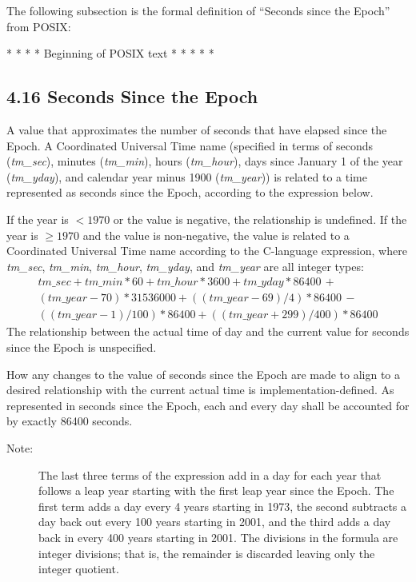 \documentclass[letterpaper,twoside]{article}
\begin{document}
The following subsection is the formal definition of ``Seconds
since the Epoch'' from POSIX:

\begin{center}
  {\large * * * * * Beginning of POSIX text * * * * *}
\end{center}

\subsection*{4.16 Seconds Since the Epoch}
A value that approximates the number
of seconds that have elapsed
since the Epoch. A Coordinated Universal Time name
(specified in terms of seconds ({\itshape tm\_sec}),
minutes ({\itshape tm\_min}),
hours ({\itshape tm\_hour}), days since January 1 of the year
({\itshape tm\_yday}),
and calendar year minus 1900 ({\itshape tm\_year})) is related to a time
represented as seconds since the Epoch, according to the expression below.

If the year is $< 1970$ or the value is negative, the relationship is
undefined.
If the year is $\geq 1970$ and the value is non-negative, the value is
related to a Coordinated Universal Time name according to the
C-language expression, where {\itshape tm\_sec}, {\itshape tm\_min},
{\itshape tm\_hour},
{\itshape tm\_yday}, and {\itshape tm\_year} are all integer types:
\begin{multline*}
  tm\_sec + tm\_min*60 + tm\_hour*3600 + tm\_yday*86400 \,+ \\
  (tm\_year-70)*31536000 + ((tm\_year-69)/4)*86400 \,- \\
  ((tm\_year-1)/100)*86400 + ((tm\_year+299)/400)*86400
\end{multline*}
The relationship between the actual time of day and the current value
for seconds since the Epoch is unspecified.

How any changes to the value of seconds since the Epoch are made
to align to a desired relationship with the current actual time
is implementation-defined. As represented in seconds since the Epoch,
each and every day shall be accounted for by exactly \num{86400} seconds.

\begin{description}
\item[Note:]
  The last three terms of the expression add in a day for each year
  that follows a leap year starting with the first leap year since
  the Epoch. The first term adds a day every 4 years starting in 1973,
  the second subtracts a day back out every 100 years starting in 2001,
  and the third adds a day back in every 400 years starting in 2001.
  The divisions in the formula are integer divisions; that is, the
  remainder is discarded leaving only the integer quotient.
\end{description}
\end{document}
